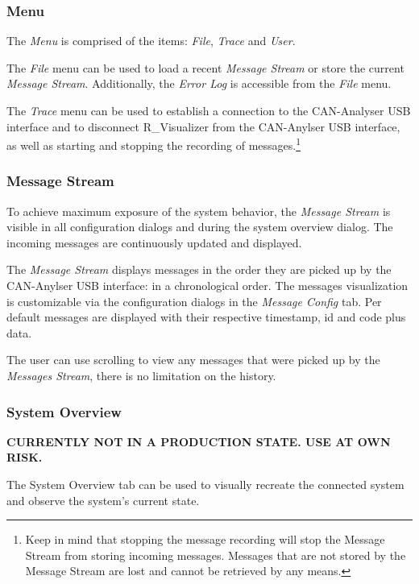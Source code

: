 \documentclass[12pt,a4paper]{scrartcl}
\begin{document}
\subsubsection{Menu}
\label{subsubsec:GettingStartedOverviewMenu}
The \textit{Menu} is comprised of the items: \textit{File}, \textit{Trace} and \textit{User}.

The \textit{File} menu can be used to load a recent \textit{Message Stream} or store the current \textit{Message Stream}. Additionally, the \textit{Error Log} is accessible from the \textit{File} menu.

The \textit{Trace} menu can be used to establish a connection to the CAN-Analyser USB interface and to disconnect R\_Visualizer from the CAN-Anylser USB interface, as well as starting and stopping the recording of messages.\footnote{Keep in mind that stopping the message recording will stop the Message Stream from storing incoming messages. Messages that are not stored by the Message Stream are lost and cannot be retrieved by any means.}

\subsubsection{Message Stream}
\label{subsubsec:GettingStartedOverviewMsgStream}
To achieve maximum exposure of the system behavior, the \textit{Message Stream} is visible in all configuration dialogs and during the system overview dialog. The incoming messages are continuously updated and displayed. 

The \textit{Message Stream} displays messages in the order they are picked up by the CAN-Anylser USB interface: in a chronological order. The messages visualization is customizable via the configuration dialogs in the \textit{Message Config} tab. Per default messages are displayed with their respective timestamp, id and code plus data. 

The user can use scrolling to view any messages that were picked up by the \textit{Messages Stream}, there is no limitation on the history.

\subsubsection{System Overview}
\label{subsubsec:GettingStartedOverviewSysOverview}
\textbf{CURRENTLY NOT IN A PRODUCTION STATE. USE AT OWN RISK.}

The System Overview tab can be used to visually recreate the connected system and observe the system's current state.
\end{document}

